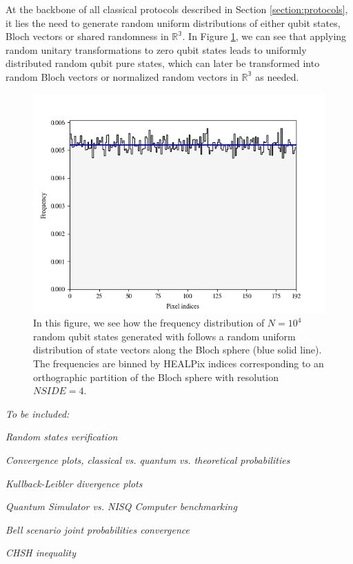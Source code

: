 At the backbone of all classical protocols described in Section \ref{section:protocols}, it lies the need to generate random uniform distributions of either qubit states, Bloch vectors or shared randomness in $\mathbb{R^3}$. In Figure \ref{fig:results_random_states}, we can see that applying random unitary transformations to zero qubit states leads to uniformly distributed random qubit pure states, which can later be transformed into random Bloch vectors or normalized random vectors in $\mathbb{R^3}$ as needed.
\begin{figure}[h]
\centering
\includegraphics[width=\textwidth]{images/random_bloch_healpix.png}
\caption{In this figure, we see how the frequency distribution of $N=10^4$ random qubit states generated with \cite{software2023} follows a random uniform distribution of state vectors along the Bloch sphere (blue solid line). The frequencies are binned by HEALPix indices corresponding to an orthographic partition of the Bloch sphere with resolution $\mathit{NSIDE}=4$.}
\label{fig:results_random_states}
\end{figure}

\textit{To be included:}

\textit{Random states verification}

\textit{Convergence plots, classical vs. quantum vs. theoretical probabilities}

\textit{Kullback-Leibler divergence plots}

\textit{Quantum Simulator vs. NISQ Computer benchmarking}

\textit{Bell scenario joint probabilities convergence}

\textit{CHSH inequality}